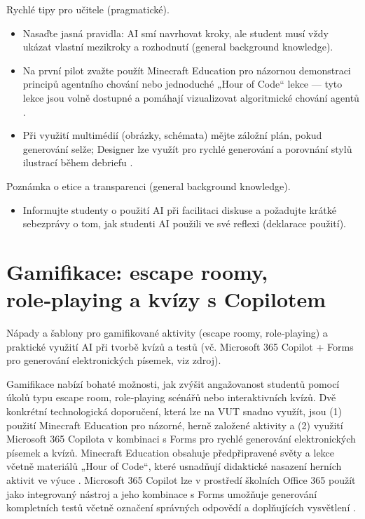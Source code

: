 \documentclass{report}%
\begin{document}
Rychlé tipy pro učitele (pragmatické).
\begin{itemize}
  \item Nasaďte jasná pravidla: AI smí navrhovat kroky, ale student musí vždy ukázat vlastní mezikroky a rozhodnutí (general background knowledge).
  \item Na první pilot zvažte použít Minecraft Education pro názornou demonstraci principů agentního chování nebo jednoduché „Hour of Code“ lekce — tyto lekce jsou volně dostupné a pomáhají vizualizovat algoritmické chování agentů \cite{kb_ai_101_tipu_pdf_04e4a115_page_15_2}.
  \item Při využití multimédií (obrázky, schémata) mějte záložní plán, pokud generování selže; Designer lze využít pro rychlé generování a porovnání stylů ilustrací během debriefu \cite{kb_ai_101_tipu_pdf_04e4a115_page_51_1}.
\end{itemize}

Poznámka o etice a transparenci (general background knowledge).
\begin{itemize}
  \item Informujte studenty o použití AI při facilitaci diskuse a požadujte krátké sebezprávy o tom, jak studenti AI použili ve své reflexi (deklarace použití).
\end{itemize}%

%
\section{Gamifikace: escape roomy, role‑playing a kvízy s Copilotem}%
Nápady a šablony pro gamifikované aktivity (escape roomy, role‑playing) a praktické využití AI při tvorbě kvízů a testů (vč. Microsoft 365 Copilot + Forms pro generování elektronických písemek, viz zdroj).%


%
Gamifikace nabízí bohaté možnosti, jak zvýšit angažovanost studentů pomocí úkolů typu escape room, role‑playing scénářů nebo interaktivních kvízů. Dvě konkrétní technologická doporučení, která lze na VUT snadno využít, jsou (1) použití Minecraft Education pro názorné, herně založené aktivity a (2) využití Microsoft 365 Copilota v kombinaci s Forms pro rychlé generování elektronických písemek a kvízů. Minecraft Education obsahuje předpřipravené světy a lekce včetně materiálů „Hour of Code“, které usnadňují didaktické nasazení herních aktivit ve výuce \cite{kb_ai_101_tipu_pdf_04e4a115_page_15_2}. Microsoft 365 Copilot lze v prostředí školních Office 365 použít jako integrovaný nástroj a jeho kombinace s Forms umožňuje generování kompletních testů včetně označení správných odpovědí a doplňujících vysvětlení \cite{kb_ai_101_tipu_pdf_04e4a115_page_3_1, kb_ai_101_tipu_pdf_04e4a115_page_36_1}.
\end{document}
